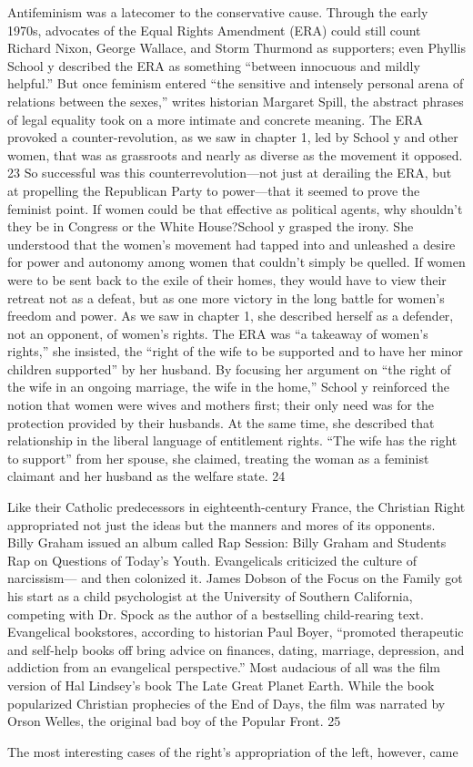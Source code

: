 Antifeminism was a latecomer to the conservative cause. Through the early 1970s, advocates of the Equal Rights Amendment (ERA) could still count Richard Nixon, George Wallace, and Storm Thurmond as supporters; even Phyllis School y described the ERA as something “between innocuous and mildly helpful.” But once feminism entered “the sensitive and intensely personal arena of relations between the sexes,” writes historian Margaret Spill, the abstract phrases of legal equality took on a more intimate and concrete meaning. The ERA provoked a counter-revolution, as we saw in chapter 1, led by School y and other women, that was as grassroots and nearly as diverse as the movement it opposed. {\color{blue} 23 } So successful was this counterrevolution—not just at derailing the ERA, but at propelling the Republican Party to power—that it seemed to prove the feminist point. If women could be that effective as political agents, why shouldn’t they be in Congress or the White House?School y grasped the irony. She understood that the women’s movement had tapped into and unleashed a desire for power and autonomy among women that couldn’t simply be quelled. If women were to be sent back to the exile of their homes, they would have to view their retreat not as a defeat, but as one more victory in the long battle for women’s freedom and power. As we saw in chapter 1, she described herself as a defender, not an opponent, of women’s rights. The ERA was “a takeaway of women’s rights,” she insisted, the “right of the wife to be supported and to have her minor children supported” by her husband. By focusing her argument on “the right of the wife in an ongoing marriage, the wife in the home,” School y reinforced the notion that women were wives and mothers first; their only need was for the protection provided by their husbands. At the same time, she described that relationship in the liberal language of entitlement rights. “The wife has the right to support” from her spouse, she claimed, treating the woman as a feminist claimant and her husband as the welfare state. {\color{blue} 24 } {\par} Like their Catholic predecessors in eighteenth-century France, the Christian Right appropriated not just the ideas but the manners and mores of its opponents. Billy Graham issued an album called Rap Session: Billy Graham and Students Rap on Questions of Today’s Youth. Evangelicals criticized the culture of narcissism— and then colonized it. James Dobson of the Focus on the Family got his start as a child psychologist at the University of Southern California, competing with Dr. Spock as the author of a bestselling child-rearing text. Evangelical bookstores, according to historian Paul Boyer, “promoted therapeutic and self-help books off bring advice on finances, dating, marriage, depression, and addiction from an evangelical perspective.” Most audacious of all was the film version of Hal Lindsey’s book The Late Great Planet Earth. While the book popularized Christian prophecies of the End of Days, the film was narrated by Orson Welles, the original bad boy of the Popular Front. {\color{blue} 25 } {\par} The most interesting cases of the right’s appropriation of the left, however, came 